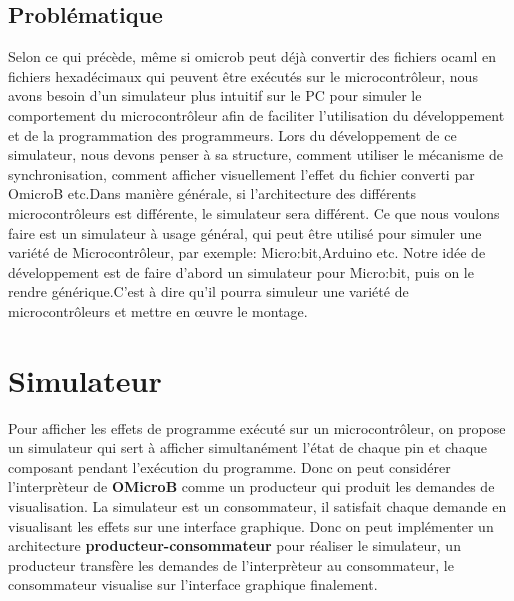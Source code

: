 \documentclass[14px]{article}
\begin{document}
\begin{figure}
	
\end{figure}

\clearpage
\subsection{Problématique}
Selon ce qui précède, même si omicrob peut déjà convertir des fichiers ocaml en fichiers hexadécimaux qui peuvent être exécutés sur le microcontrôleur, nous avons besoin d'un simulateur plus intuitif sur le PC pour simuler le comportement du microcontrôleur afin de faciliter l'utilisation du développement et de la programmation des programmeurs. Lors du développement de ce simulateur, nous devons penser à sa structure, comment utiliser le mécanisme de synchronisation, comment afficher visuellement l'effet du fichier converti par OmicroB etc.Dans manière générale, si l'architecture des différents microcontrôleurs est différente, le simulateur sera différent. Ce que nous voulons faire est un simulateur à usage général, qui peut être utilisé pour simuler une variété de Microcontrôleur, par exemple: Micro:bit,Arduino etc. Notre idée de développement est de faire d'abord un simulateur pour Micro:bit, puis on le rendre générique.C'est à dire qu'il pourra simuleur une variété de microcontrôleurs et mettre en œuvre le montage.

\clearpage
\pagestyle{fancy}
\rhead{\thepage}
\fancyfoot{}
\section{Simulateur}
Pour afficher les effets de programme exécuté sur un microcontrôleur, on propose un simulateur qui sert à afficher simultanément l'état de chaque pin et chaque composant pendant l'exécution du programme. Donc on peut considérer l'interprèteur de \textbf{OMicroB} comme un producteur qui produit les demandes de visualisation. La simulateur est un consommateur, il satisfait chaque demande en visualisant les effets sur une interface graphique. Donc on peut implémenter un architecture \textbf{producteur-consommateur} pour réaliser le simulateur, un producteur transfère les demandes de l'interprèteur au consommateur, le consommateur visualise sur l'interface graphique finalement.\\
\end{document}
